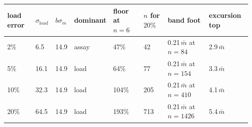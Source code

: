 \begin{tabular}{@{}llllllll@{}}
\toprule
\textbf{load error} & \textbf{$\sigma_{\mathrm{load}}$} & \textbf{$b\sigma_m$} & \textbf{dominant} & \textbf{floor at $n=6$} & \textbf{$n$ for $20\%$} & \textbf{band foot} & \textbf{excursion top} \\
\midrule
2\% & 6.5 & 14.9 & assay & 47\% & 42 & 0.21$\,\bar m$ at $n=84$ & 2.9$\,\bar m$ \\
5\% & 16.1 & 14.9 & load & 64\% & 77 & 0.21$\,\bar m$ at $n=154$ & 3.3$\,\bar m$ \\
10\% & 32.3 & 14.9 & load & 104\% & 205 & 0.21$\,\bar m$ at $n=410$ & 4.1$\,\bar m$ \\
20\% & 64.5 & 14.9 & load & 193\% & 713 & 0.21$\,\bar m$ at $n=1426$ & 5.4$\,\bar m$ \\
\bottomrule
\end{tabular}
